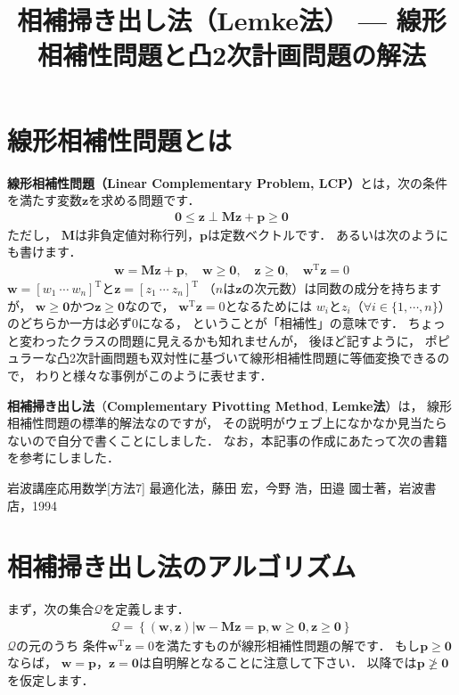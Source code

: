 \documentclass[a4paper]{jsarticle}
\title{相補掃き出し法（Lemke法） --- 線形相補性問題と凸2次計画問題の解法}
\begin{document}
\maketitle

\section{線形相補性問題とは}

{\bf 線形相補性問題（Linear Complementary Problem, LCP）}とは，次の条件を満たす変数$\boldsymbol{z}$を求める問題です．
\begin{align*}
\boldsymbol{0}\leq\boldsymbol{z}\perp\boldsymbol{M}\boldsymbol{z}+\boldsymbol{p}\geq\boldsymbol{0}
\end{align*}
ただし，
$\boldsymbol{M}$は非負定値対称行列，$\boldsymbol{p}$は定数ベクトルです．
あるいは次のようにも書けます．
\begin{align*}
\boldsymbol{w}=\boldsymbol{M}\boldsymbol{z}+\boldsymbol{p},\quad
\boldsymbol{w}\geq\boldsymbol{0},\quad
\boldsymbol{z}\geq\boldsymbol{0},\quad
\boldsymbol{w}^{\mathrm{T}}\boldsymbol{z}=0
\end{align*}
$\boldsymbol{w}=[w_{1}~\cdots~w_{n}]^{\mathrm{T}}$と$\boldsymbol{z}=[z_{1}~\cdots~z_{n}]^{\mathrm{T}}$
（$n$は$\boldsymbol{z}$の次元数）は同数の成分を持ちますが，
$\boldsymbol{w}\geq\boldsymbol{0}$かつ$\boldsymbol{z}\geq\boldsymbol{0}$なので，
$\boldsymbol{w}^{\mathrm{T}}\boldsymbol{z}=0$となるためには
$w_{i}$と$z_{i}$（$\forall i\in\{1,\cdots,n\}$）のどちらか一方は必ず0になる，
ということが「相補性」の意味です．
ちょっと変わったクラスの問題に見えるかも知れませんが，
後ほど記すように，
ポピュラーな凸2次計画問題も双対性に基づいて線形相補性問題に等価変換できるので，
わりと様々な事例がこのように表せます．


{\bf 相補掃き出し法}（{\bf Complementary Pivotting Method}, {\bf Lemke法}）は，
線形相補性問題の標準的解法なのですが，
その説明がウェブ上になかなか見当たらないので自分で書くことにしました．
なお，本記事の作成にあたって次の書籍を参考にしました．

\begin{screen}
岩波講座応用数学[方法7] 最適化法，藤田 宏，今野 浩，田邉 國士著，岩波書店，1994
\end{screen}


\section{相補掃き出し法のアルゴリズム}

まず，次の集合$\mathcal{Q}$を定義します．
\begin{align*}
\mathcal{Q}=\left\{(\boldsymbol{w},\boldsymbol{z})\left|
\boldsymbol{w}-\boldsymbol{M}\boldsymbol{z}=\boldsymbol{p},\boldsymbol{w}\geq\boldsymbol{0}, \boldsymbol{z}\geq\boldsymbol{0}
\right.\right\}
\end{align*}
$\mathcal{Q}$の元のうち
条件$\boldsymbol{w}^{\mathrm{T}}\boldsymbol{z}=0$を満たすものが線形相補性問題の解です．
もし$\boldsymbol{p}\geq\boldsymbol{0}$ならば，
$\boldsymbol{w}=\boldsymbol{p}$，$\boldsymbol{z}=\boldsymbol{0}$は自明解となることに注意して下さい．
以降では$\boldsymbol{p}\ngeq\boldsymbol{0}$を仮定します．
\end{document}
